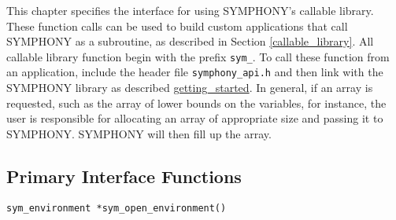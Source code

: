 
\label{C_Interface}

This chapter specifies the interface for using SYMPHONY's callable
library. These function calls can be used to build custom applications that
call SYMPHONY as a subroutine, as described in Section
\ref{callable_library}. All callable library function begin with the
prefix {\tt sym\_}. To call these function from an application, include the
header file {\tt symphony\_api.h} and then link with the SYMPHONY library as
described \hyperref{here}{in Section }{}{getting_started}. In general, if an
array is requested, such as the array of lower bounds on the variables, for
instance, the user is responsible for allocating an array of appropriate size
and passing it to SYMPHONY. SYMPHONY will then fill up the array.

\newpage

\subsection{Primary Interface Functions}
\bd


\begin{verbatim}
sym_environment *sym_open_environment()
\end{verbatim}


